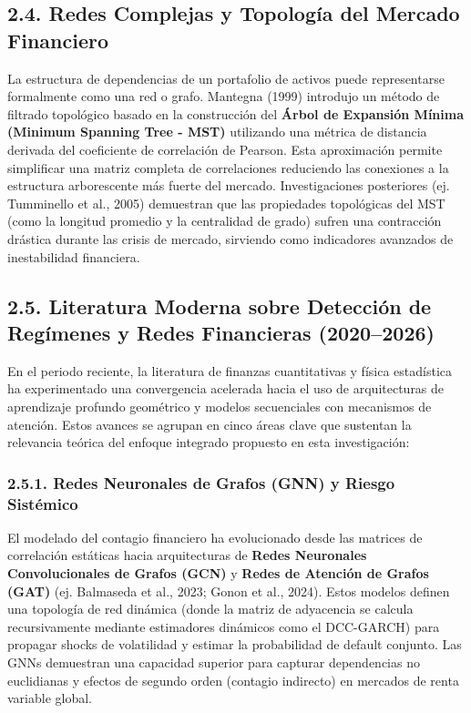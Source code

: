 \documentclass[
  12pt,
]{article}
\begin{document}
\subsection{2.4. Redes Complejas y Topología del Mercado
Financiero}\label{redes-complejas-y-topologuxeda-del-mercado-financiero}

La estructura de dependencias de un portafolio de activos puede
representarse formalmente como una red o grafo. Mantegna (1999)
introdujo un método de filtrado topológico basado en la construcción del
\textbf{Árbol de Expansión Mínima (Minimum Spanning Tree - MST)}
utilizando una métrica de distancia derivada del coeficiente de
correlación de Pearson. Esta aproximación permite simplificar una matriz
completa de correlaciones reduciendo las conexiones a la estructura
arborescente más fuerte del mercado. Investigaciones posteriores (ej.
Tumminello et al., 2005) demuestran que las propiedades topológicas del
MST (como la longitud promedio y la centralidad de grado) sufren una
contracción drástica durante las crisis de mercado, sirviendo como
indicadores avanzados de inestabilidad financiera.

\subsection{2.5. Literatura Moderna sobre Detección de Regímenes y Redes
Financieras
(2020--2026)}\label{literatura-moderna-sobre-detecciuxf3n-de-reguxedmenes-y-redes-financieras-20202026}

En el periodo reciente, la literatura de finanzas cuantitativas y física
estadística ha experimentado una convergencia acelerada hacia el uso de
arquitecturas de aprendizaje profundo geométrico y modelos secuenciales
con mecanismos de atención. Estos avances se agrupan en cinco áreas
clave que sustentan la relevancia teórica del enfoque integrado
propuesto en esta investigación:

\subsubsection{2.5.1. Redes Neuronales de Grafos (GNN) y Riesgo
Sistémico}\label{redes-neuronales-de-grafos-gnn-y-riesgo-sistuxe9mico}

El modelado del contagio financiero ha evolucionado desde las matrices
de correlación estáticas hacia arquitecturas de \textbf{Redes Neuronales
Convolucionales de Grafos (GCN)} y \textbf{Redes de Atención de Grafos
(GAT)} (ej. Balmaseda et al., 2023; Gonon et al., 2024). Estos modelos definen una topología de
red dinámica (donde la matriz de adyacencia se calcula recursivamente
mediante estimadores dinámicos como el DCC-GARCH) para propagar shocks
de volatilidad y estimar la probabilidad de default conjunto. Las GNNs
demuestran una capacidad superior para capturar dependencias no
euclidianas y efectos de segundo orden (contagio indirecto) en mercados
de renta variable global.
\end{document}
